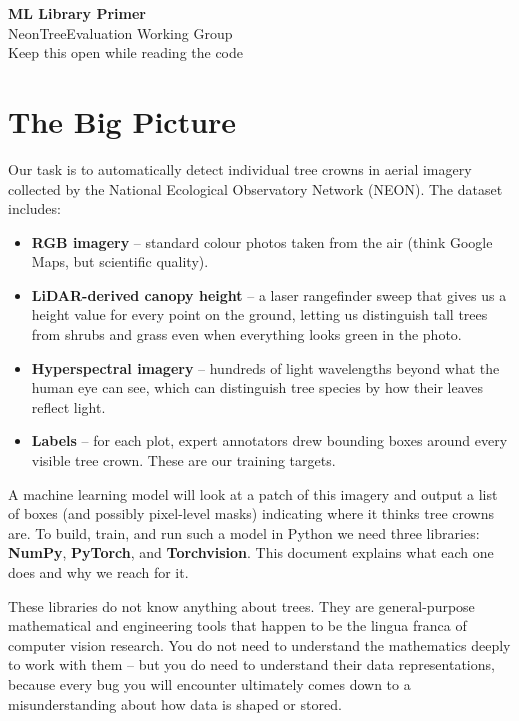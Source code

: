 \documentclass[11pt, a4paper]{article}
\newenvironment{note}{%
  \begin{tcolorbox}[
    colback=notebg, colframe=noteframe,
    fonttitle=\bfseries, title=Note,
    breakable, enhanced
  ]
}{%
  \end{tcolorbox}
}
\begin{document}
\begin{center}
  {\LARGE\bfseries ML Library Primer}\\[0.4em]
  {\large NeonTreeEvaluation Working Group}\\[0.2em]
  {\normalsize\color{gray} Keep this open while reading the code}
\end{center}

\vspace{1em}
\tableofcontents
\vspace{1em}

\section{The Big Picture}

Our task is to automatically detect individual tree crowns in aerial imagery
collected by the National Ecological Observatory Network (NEON). The dataset
includes:

\begin{itemize}[nosep]
  \item \textbf{RGB imagery} -- standard colour photos taken from the air
        (think Google Maps, but scientific quality).
  \item \textbf{LiDAR-derived canopy height} -- a laser rangefinder sweep that
        gives us a height value for every point on the ground, letting us
        distinguish tall trees from shrubs and grass even when everything looks
        green in the photo.
  \item \textbf{Hyperspectral imagery} -- hundreds of light wavelengths beyond
        what the human eye can see, which can distinguish tree species by how
        their leaves reflect light.
  \item \textbf{Labels} -- for each plot, expert annotators drew bounding boxes
        around every visible tree crown. These are our training targets.
\end{itemize}

A machine learning model will look at a patch of this imagery and output a
list of boxes (and possibly pixel-level masks) indicating where it thinks tree
crowns are. To build, train, and run such a model in Python we need three
libraries: \textbf{NumPy}, \textbf{PyTorch}, and \textbf{Torchvision}. This
document explains what each one does and why we reach for it.

\begin{note}
  These libraries do not know anything about trees. They are general-purpose
  mathematical and engineering tools that happen to be the lingua franca of
  computer vision research. You do not need to understand the mathematics
  deeply to work with them -- but you do need to understand their data
  representations, because every bug you will encounter ultimately comes down
  to a misunderstanding about how data is shaped or stored.
\end{note}
\end{document}
